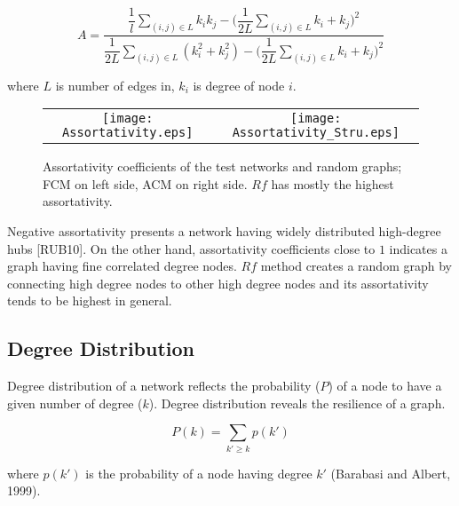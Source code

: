 \documentclass[12pt]{article}
\begin{document}
\begin{equation}
A = \frac{\dfrac{1}{l} \sum\limits_{(i,j) \in L}  k_i k_j -  \Big ( \dfrac{1}{2L} \sum\limits_{(i,j) \in L}k_i + k_j  \Big )^2}{\dfrac{1}{2L}\sum\limits_{(i,j) \in L} ( k_i^2+  k_j^2) -\Big ( \dfrac{1}{2L} \sum\limits_{(i,j) \in L}k_i + k_j  \Big )^2 }
\end{equation}

where $L$ is number of edges in, $k_i$ is degree of node $i$.


\begin{figure}[htp]

  \centering

    \begin{tabular}{cc}


    \texttt{[image: Assortativity.eps]} &

    \texttt{[image: Assortativity\_Stru.eps]}\\

  \end{tabular}

 \label{figur}\caption{Assortativity coefficients of the test networks and random graphs; FCM on left side, ACM on right side. $Rf$ has mostly the highest assortativity.}
 
\end{figure}

Negative assortativity presents a network having widely distributed high-degree hubs [RUB10]. On the other hand, assortativity coefficients close to $1$ indicates a graph having fine correlated degree nodes. $Rf$ method creates a random graph by connecting high degree nodes to other high degree nodes and its assortativity tends to be highest in general. 

\newpage

\subsection{Degree Distribution}
Degree distribution of a network reflects the probability ($P$) of a node to have a given number of degree ($k$). Degree distribution reveals the resilience of a graph. 

\begin{equation}
 P(k) = \sum\limits_{k' \geq k} p(k')
\end{equation}

where $p(k')$ is the probability of a node having degree $k'$ (Barabasi and Albert, 1999). 
\end{document}
